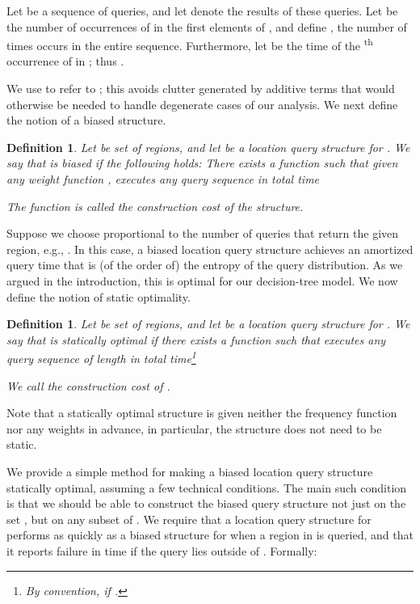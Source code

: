 \documentclass[11pt]{article}
\newtheorem{definition}[figure]{Definition}
\begin{document}
Let  
be a sequence of  queries, and 
let   
denote the results of these queries.
Let  be the number of occurrences of  in the first  elements
of , and define , the number of
times  occurs in the entire sequence. Furthermore, let  be
the time of the \textsuperscript{th} occurrence of  in ; 
thus .

We use  to refer to ; this avoids clutter generated 
by additive terms that would otherwise be needed to handle degenerate cases 
of our analysis.
We next define the notion of a biased  structure.
\begin{definition} 
Let  be set of  regions, 
and let  be a location query structure for .
We say that  is \emph{biased} if the following holds: There
exists a function  such that
given any weight function ,
 executes any query sequence  in total time

The function  is called the \emph{construction cost} of the
structure.  
\end{definition}

Suppose we choose
 proportional to the number of queries that return the given
region, e.g., .
In this case, a biased location query structure
achieves an amortized query time that is 
(of the order of) the entropy  of the query 
distribution. As we argued in the introduction, this is optimal for our
decision-tree model. We now define the notion of static optimality.

\begin{definition} \label{def:statopt}
Let  be set of  regions, and
let  be a location query structure for .
We say that  is \emph{statically optimal} if 
there exists a function 
such that
 executes any query sequence  of length  
in total time\footnote{By convention,  if
.}

We call  the \emph{construction cost} of .
\end{definition}

Note that a statically optimal structure is given neither 
the frequency function  nor any weights in advance, in
particular, the structure does not need to be static.

We provide a simple method for making a biased location query
structure statically optimal, assuming a few technical
conditions. The main such condition is that we should be able to construct
the biased query structure not just on the set , but on any subset 
 of . We require that a location query structure 
for  performs as quickly as a biased structure for  when a 
region in  is queried, and that it reports failure in  time 
if the query lies outside of .
Formally:
\end{document}

